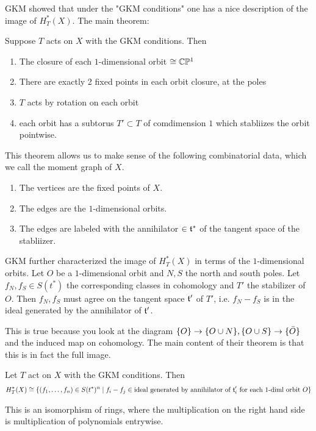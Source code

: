 \documentclass[12pt]{article}
\begin{document}
GKM showed that under the "GKM conditions" one has a nice description of the image of $H_T^*(X)$.
The main theorem: 

\begin{theorem}
    Suppose $T$ acts on $X$ with the GKM conditions. Then \begin{enumerate}
        \item The closure of each $1$-dimensional orbit $\cong \mathbb{C}\mathbb{P}^1$
        \item There are exactly 2 fixed points in each orbit closure, at the poles
        \item $T$ acts by rotation on each orbit
        \item each orbit has a subtorus $T'\subset T$ of comdimension $1$ which stabliizes the orbit pointwise.
    \end{enumerate}
\end{theorem}

This theorem allows us to make sense of the following combinatorial data, which we call the moment graph of $X$.
\begin{enumerate}
    \item The vertices are the fixed points of $X$.
    \item The edges are the $1$-dimensional orbits.
    \item The edges are labeled with the annihilator $\in \mathfrak{t}^*$ of the tangent space of the stabliizer.
\end{enumerate}
\hfill

GKM further characterized the image of $H_T^*(X)$ in terms of the $1$-dimensional orbits. Let $O$ be a $1$-dimensional orbit and $N,S$ the north and south poles.
Let $f_N,f_S \in S(t^*)$ the corresponding classes in cohomology and $T'$ the stabilizer of $O$.
Then $f_N,f_S$ must agree on the tangent space $\mathfrak{t}'$ of $T'$, i.e. $f_N - f_S$ is in the ideal generated by the annihilator of $\mathfrak{t}'$.

\hfill

This is true because you look at the diagram $\{O\}\to\{O\cup N\},\{O\cup S\}\to\{\bar O\}$
 and the induced map on cohomology. The main content of their theorem is that this is in fact the full image.

 \begin{theorem}
    Let $T$ act on $X$ with the GKM conditions. Then \begin{align*}
        H_T^*(X) \cong\{(f_1,\dots,f_n)\in S(t^*)^n\mid f_i - f_j \in \text{ideal generated by annihilator of }\mathfrak{t}_i' \text{ for each $1$-diml orbit }O\}
    \end{align*}
 \end{theorem}
 This is an isomorphism of rings, where the multiplication on the right hand side is multiplication of polynomials entrywise.
\end{document}
